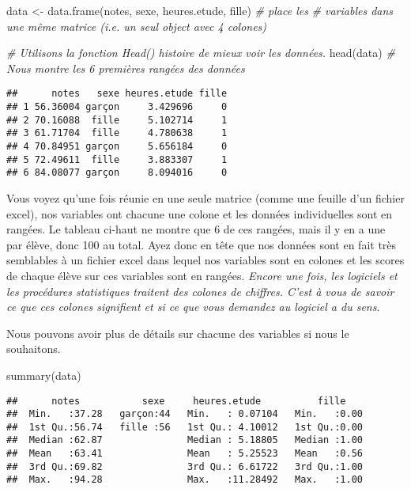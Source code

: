 \documentclass[
]{book}
\newenvironment{Shaded}{\begin{snugshade}}{\end{snugshade}}
\newcommand{\CommentTok}[1]{\textcolor[rgb]{0.56,0.35,0.01}{\textit{#1}}}
\newcommand{\FunctionTok}[1]{\textcolor[rgb]{0.00,0.00,0.00}{#1}}
\newcommand{\NormalTok}[1]{#1}
\newcommand{\OtherTok}[1]{\textcolor[rgb]{0.56,0.35,0.01}{#1}}
\begin{document}
\begin{Shaded}
\begin{Highlighting}[]
\NormalTok{data }\OtherTok{\textless{}{-}} \FunctionTok{data.frame}\NormalTok{(notes, sexe, heures.etude, fille) }\CommentTok{\# place les  }
\CommentTok{\# variables dans une même matrice (i.e. un seul object avec 4 colones)}

\CommentTok{\# Utilisons la fonction Head() histoire de mieux voir les données. }
\FunctionTok{head}\NormalTok{(data) }\CommentTok{\# Nous montre les 6 premières rangées des données}
\end{Highlighting}
\end{Shaded}

\begin{verbatim}
##      notes   sexe heures.etude fille
## 1 56.36004 garçon     3.429696     0
## 2 70.16088  fille     5.102714     1
## 3 61.71704  fille     4.780638     1
## 4 70.84951 garçon     5.656184     0
## 5 72.49611  fille     3.883307     1
## 6 84.08077 garçon     8.094016     0
\end{verbatim}

Vous voyez qu'une fois réunie en une seule matrice (comme une feuille d'un fichier excel), nos variables ont chacune une colone et les données individuelles sont en rangées. Le tableau ci-haut ne montre que 6 de ces rangées, mais il y en a une par élève, donc 100 au total. Ayez donc en tête que nos données sont en fait très semblables à un fichier excel dans lequel nos variables sont en colones et les scores de chaque élève sur ces variables sont en rangées. \emph{Encore une fois, les logiciels et les procédures statistiques traitent des colones de chiffres. C'est à vous de savoir ce que ces colones signifient et si ce que vous demandez au logiciel a du sens}.

Nous pouvons avoir plus de détails sur chacune des variables si nous le souhaitons.

\begin{Shaded}
\begin{Highlighting}[]
\FunctionTok{summary}\NormalTok{(data)}
\end{Highlighting}
\end{Shaded}

\begin{verbatim}
##      notes           sexe     heures.etude          fille     
##  Min.   :37.28   garçon:44   Min.   : 0.07104   Min.   :0.00  
##  1st Qu.:56.74   fille :56   1st Qu.: 4.10012   1st Qu.:0.00  
##  Median :62.87               Median : 5.18805   Median :1.00  
##  Mean   :63.41               Mean   : 5.25523   Mean   :0.56  
##  3rd Qu.:69.82               3rd Qu.: 6.61722   3rd Qu.:1.00  
##  Max.   :94.28               Max.   :11.28492   Max.   :1.00
\end{verbatim}
\end{document}
